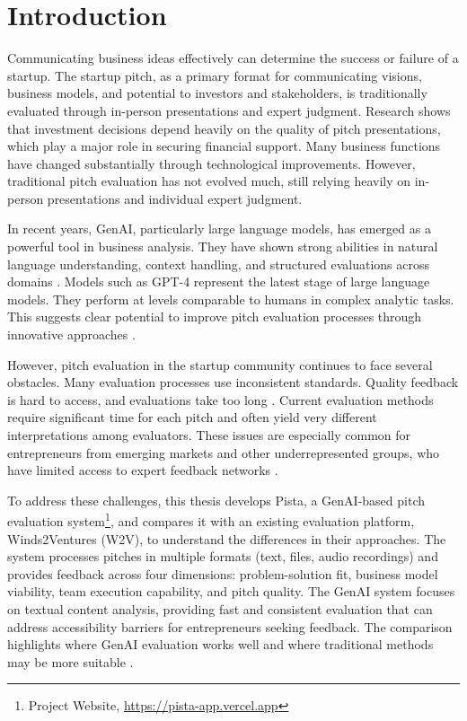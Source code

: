 \chapter{Introduction}

\label{ch:introduction}

Communicating business ideas effectively can determine the success or failure of a startup. The startup pitch, as a primary format for communicating visions, business models, and potential to investors and stakeholders, is traditionally evaluated through in-person presentations and expert judgment.  Research shows that investment decisions depend heavily on the quality of pitch presentations, which play a major role in securing financial support\cite{masterpresentat}. Many business functions have changed substantially through technological improvements. However, traditional pitch evaluation has not evolved much, still relying heavily on in-person presentations and individual expert judgment.

In recent years, GenAI, particularly large language models, has emerged as a powerful tool in business analysis. They have shown strong abilities in natural language understanding, context handling, and structured evaluations across domains \cite{Ozince2024}. Models such as GPT-4 represent the latest stage of large language models. They perform at levels comparable to humans in complex analytic tasks. This suggests clear potential to improve pitch evaluation processes through innovative approaches \cite{gpt}.

However, pitch evaluation in the startup community continues to face several obstacles. Many evaluation processes use inconsistent standards. Quality feedback is hard to access, and evaluations take too long \cite{StartupEvaluati, Kalvapalle2024}. Current evaluation methods require significant time for each pitch and often yield very different interpretations among evaluators. These issues are especially common for entrepreneurs from emerging markets and other underrepresented groups, who have limited access to expert feedback networks \cite{BreakingBarrier}.

To address these challenges, this thesis develops Pista, a GenAI-based pitch evaluation system\footnote{Project Website, \url{https://pista-app.vercel.app}}, and compares it with an existing evaluation platform, Winds2Ventures (W2V), to understand the differences in their approaches. The system processes pitches in multiple formats (text, files, audio recordings) and provides feedback across four dimensions: problem-solution fit, business model viability, team execution capability, and pitch quality. The GenAI system focuses on textual content analysis, providing fast and consistent evaluation that can address accessibility barriers for entrepreneurs seeking feedback. The comparison highlights where GenAI evaluation works well and where traditional methods may be more suitable \cite{TheFutureofAIEv}.

